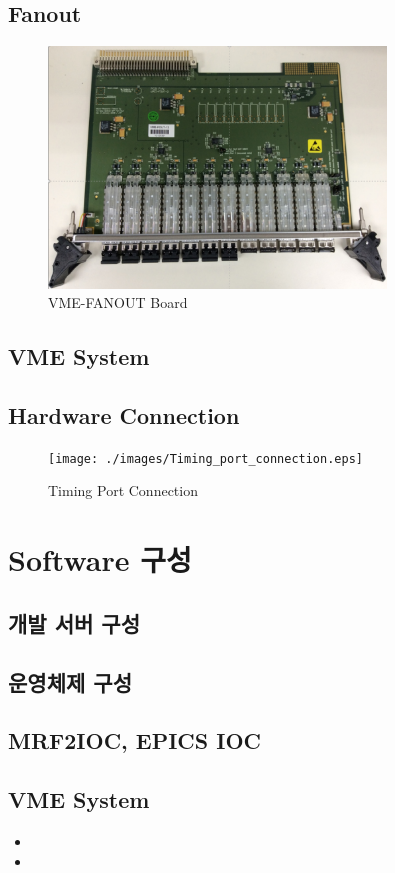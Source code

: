 \documentclass[11pt
  , a4paper
  , article
  , oneside
]{memoir}
\begin{document}
\clearpage

\section{Fanout}

\begin{figure}[h!]
	\centering
	\includegraphics[width=0.8\textwidth]{./images/fanout.eps}
	\caption{VME-FANOUT Board}
	\label{fig:fanout_board} 
\end{figure}

\section{VME System}

\section{Hardware Connection}

\begin{figure}[h!]
	\centering
	\texttt{[image: ./images/Timing\_port\_connection.eps]}
	\caption{Timing Port Connection}
	\label{fig:timing_port_conf} 
\end{figure}


\clearpage

\chapter{Software 구성}
\section{개발 서버 구성}
\section{운영체제 구성}

\section{MRF2IOC, EPICS IOC}

\section{VME System}


\begin{itemize}
	\item 
	\item 
\end{itemize}



\clearpage


\end{document}
